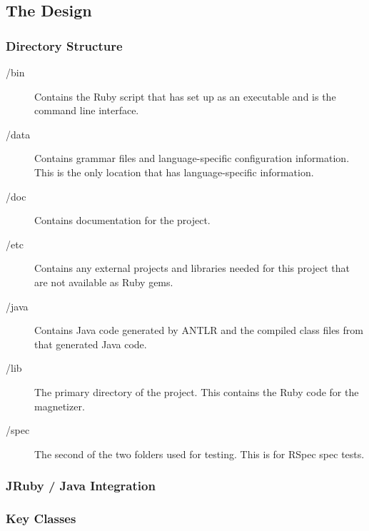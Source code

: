 \documentclass[letter,10pt]{article}
\begin{document}
\subsection{The Design}

\subsubsection{Directory Structure}
\begin{description}
 \item [/bin]
    Contains the Ruby script that has set up as an 
executable and is the command line interface.

 \item [/data]
    Contains grammar files and language-specific 
configuration information. This is the only location that has 
language-specific information.

 \item [/doc]
    Contains documentation for the project.
    
 \item [/etc]
    Contains any external projects and libraries needed for this 
project that are not available as Ruby gems.

 \item [/java]
    Contains Java code generated by ANTLR and the compiled class files 
from that generated Java code.

 \item [/lib]
    The primary directory of the project. This contains the Ruby code 
for the magnetizer.

 \item [/spec]
    The second of the two folders used for testing. This is for RSpec 
spec tests.

\end{description}


\subsubsection{JRuby / Java Integration}

\subsubsection{Key Classes}
\end{document}

